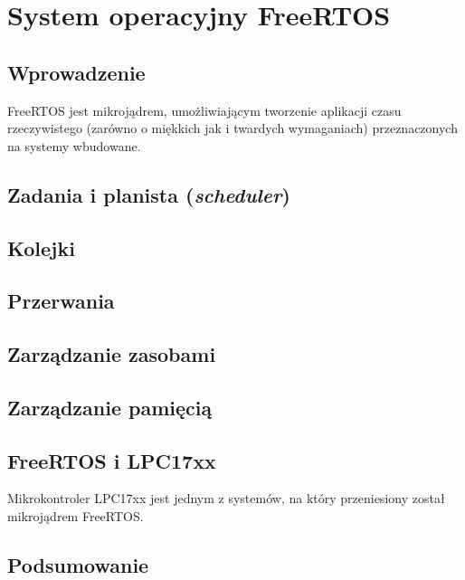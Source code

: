 \chapter{System operacyjny FreeRTOS}
\label{cha:freertos}

\section{Wprowadzenie}
\label{sec:rtosWprowadzenie}

FreeRTOS jest mikrojądrem, umożliwiającym tworzenie aplikacji czasu rzeczywistego (zarówno o miękkich jak i twardych wymaganiach) przeznaczonych na systemy wbudowane. 

\section{Zadania i planista (\emph{scheduler})}
\label{sec:rtosScheduler}

\section{Kolejki}
\label{sec:rtosKolejki}

\section{Przerwania}
\label{sec:rtosPrzerwania}

\section{Zarządzanie zasobami}
\label{sec:rtosZasoby}

\section{Zarządzanie pamięcią}
\label{sec:rtosPamiec}

\section{FreeRTOS i LPC17xx}
\label{sec:rtosLPC}

Mikrokontroler LPC17xx jest jednym z systemów, na który przeniesiony został mikrojądrem FreeRTOS.

\section{Podsumowanie}
\label{sec:rtosPodsumowanie}